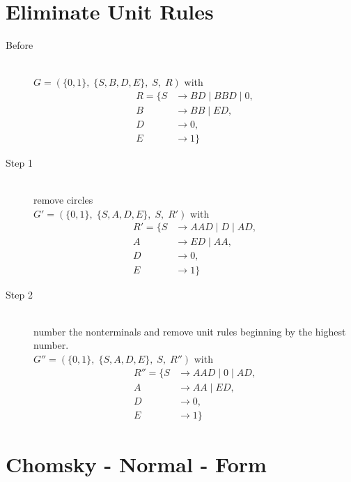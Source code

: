 \documentclass{article}
\begin{document}
\section{Eliminate Unit Rules}

\begin{description}
	\item[Before] \hfill \\ 
		$G=\left(\{	0, 1\},\;\{ S, B, D, E\},\;S,\;R\right)$ with
	\begin{align*}
		R=\{	S &\rightarrow BD\;|\;BBD\;|\;0, \\ 
		B &\rightarrow BB\;|\;ED, \\ 
		D &\rightarrow 0, \\ 
		E &\rightarrow 1\}
	\end{align*}
	\item[Step 1] \hfill \\ 
	remove circles\\ 
	$G'=\left(\{	0, 1\},\;\{ S, A, D, E\},\;S,\;R'\right)$ with
	\begin{align*}
		R'=\{	S &\rightarrow AAD\;|\;D\;|\;AD, \\ 
		A &\rightarrow ED\;|\;AA, \\ 
		D &\rightarrow 0, \\ 
		E &\rightarrow 1\}
	\end{align*}
	\item[Step 2] \hfill \\ 
	number the nonterminals and remove unit rules beginning by the highest number.\\ 
	$G''=\left(\{	0, 1\},\;\{ S, A, D, E\},\;S,\;R''\right)$ with
	\begin{align*}
		R''=\{	S &\rightarrow AAD\;|\;0\;|\;AD, \\ 
		A &\rightarrow AA\;|\;ED, \\ 
		D &\rightarrow 0, \\ 
		E &\rightarrow 1\}
	\end{align*}
\end{description}

\section{Chomsky - Normal - Form}
\end{document}
